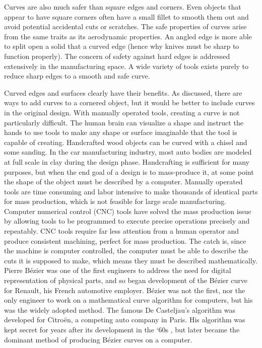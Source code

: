 \documentclass[12pt,letterpaper]{article}
\begin{document}
Curves are also much safer than square edges and corners. Even objects that appear to have square corners often have a small fillet to smooth them out and avoid potential accidental cuts or scratches. The safe properties of curves arise from the same traits as its aerodynamic properties. An angled edge is more able to split open a solid that a curved edge (hence why knives must be sharp to function properly). The concern of safety against hard edges is addressed extensively in the manufacturing space. A wide variety of tools exists purely to reduce sharp edges to a smooth and safe curve.

Curved edges and surfaces clearly have their benefits. As discussed, there are ways to add curves to a cornered object, but it would be better to include curves in the original design. With manually operated tools, creating a curve is not particularly difficult. The human brain can visualize a shape and instruct the hands to use tools to make any shape or surface imaginable that the tool is capable of creating. Handcrafted wood objects can be curved with a chisel and some sanding. In the car manufacturing industry, most auto bodies are modeled at full scale in clay during the design phase. Handcrafting is sufficient for many purposes, but when the end goal of a design is to mass-produce it, at some point the shape of the object must be described by a computer. Manually operated tools are time consuming and labor intensive to make thousands of identical parts for mass production, which is not feasible for large scale manufacturing. Computer numerical control (CNC) tools have solved the mass production issue by allowing tools to be programmed to execute precise operations precisely and repeatably. CNC tools require far less attention from a human operator and produce consistent machining, perfect for mass production. The catch is, since the machine is computer controlled, the computer must be able to describe the cuts it is supposed to make, which means they must be described mathematically. Pierre B\'ezier was one of the first engineers to address the need for digital representation of physical parts, and so began development of the B\'ezier curve for Renault, his French automotive employer. B\'ezier was not the first, nor the only engineer to work on a mathematical curve algorithm for computers, but his was the widely adopted method. The famous De Casteljau’s algorithm was developed for Citroën, a competing auto company in Paris. His algorithm was kept secret for years after its development in the ‘60s \citep{handbook}, but later became the dominant method of producing B\'ezier curves on a computer. 
\end{document}
